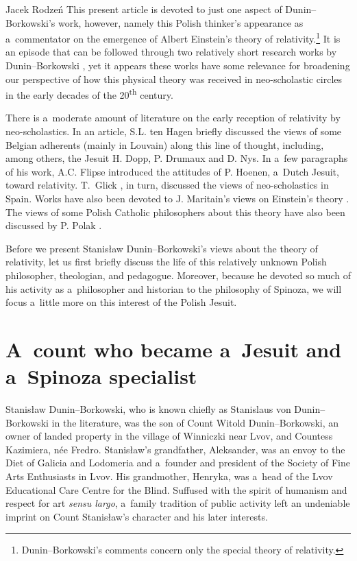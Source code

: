 \begin{artengenv}{Jacek Rodzeń}
This present article is devoted to just one aspect of Dunin–Borkowski's work, however, namely this Polish thinker's appearance as a~commentator on the emergence of Albert Einstein's theory of relativity.\footnote{Dunin–Borkowski's comments concern only the special theory of relativity.} It is an episode that can be followed through two relatively short research works by Dunin–Borkowski
\parencites*[][]{dunin-borkowski_auf_1921}[][]{dunin-borkowski_neue_1921}, %
 yet it appears these works have some relevance for broadening our perspective of how this physical theory was received in neo-scholastic circles in the early decades of the 20\textsuperscript{th} century.

There is a~moderate amount of literature on the early reception of relativity by neo-scholastics. In an article, S.L. ten Hagen
\parencite*[][pp.238–239]{hagen_local_2020} %
 briefly discussed the views of some Belgian adherents (mainly in Louvain) along this line of thought, including, among others, the Jesuit H. Dopp, P. Drumaux and D. Nys. In a~few paragraphs of his work, A.C. Flipse 
\parencite*[][pp.1148–1149]{flipse_between_2010} %
 introduced the attitudes of P. Hoenen, a~Dutch Jesuit, toward relativity. T.~Glick 
\parencite*[][pp.240–242]{glick_relativity_1987}, %
 in turn, discussed the views of neo-scholastics in Spain. Works have also been devoted to J. Maritain's views on Einstein's theory 
\parencites[][pp.161–182]{klosak_z_1980}[][]{wolak_filozofia_1991}. %
 The views of some Polish Catholic philosophers about this theory have also been discussed by P. Polak 
\parencite*[][]{polak_zmagania_2016}.%


Before we present Stanisław Dunin–Borkowski's views about the theory of relativity, let us first briefly discuss the life of this relatively unknown Polish philosopher, theologian, and pedagogue. Moreover, because he devoted so much of his activity as a~philosopher and historian to the philosophy of Spinoza, we will focus a~little more on this interest of the Polish Jesuit.

\section{A~count who became a~Jesuit and a~Spinoza specialist}
Stanisław Dunin–Borkowski, who is known chiefly as Stanislaus von Dunin–Borkowski in the literature, was the son of Count Witold Dunin–Borkowski, an owner of landed property in the village of Winniczki near Lvov, and Countess Kazimiera, née Fredro. Stanisław's grandfather, Aleksander, was an envoy to the Diet of Galicia and Lodomeria and a~founder and president of the Society of Fine Arts Enthusiasts in Lvov. His grandmother, Henryka, was a~head of the Lvov Educational Care Centre for the Blind. Suffused with the spirit of humanism and respect for art \textit{sensu largo}, a~family tradition of public activity left an undeniable imprint on Count Stanisław's character and his later interests.


\end{artengenv}
